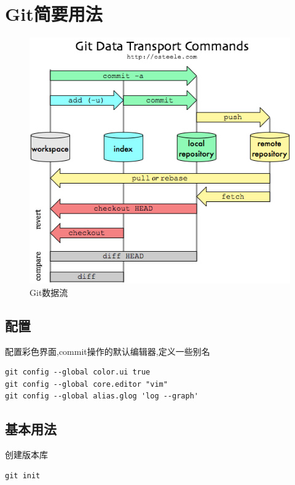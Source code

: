 
\section{Git简要用法}

\begin{figure}[htpb]
    \begin{center}
        \includegraphics[keepaspectratio,width=0.5\paperwidth]{Pictures/git_dataflow.png}
    \end{center}
    \caption{Git数据流}
\end{figure}

\subsection{配置}
配置彩色界面,commit操作的默认编辑器,定义一些别名
\begin{verbatim}
git config --global color.ui true
git config --global core.editor "vim"
git config --global alias.glog 'log --graph'
\end{verbatim}

\subsection{基本用法}
创建版本库

\begin{verbatim}
git init
\end{verbatim}


